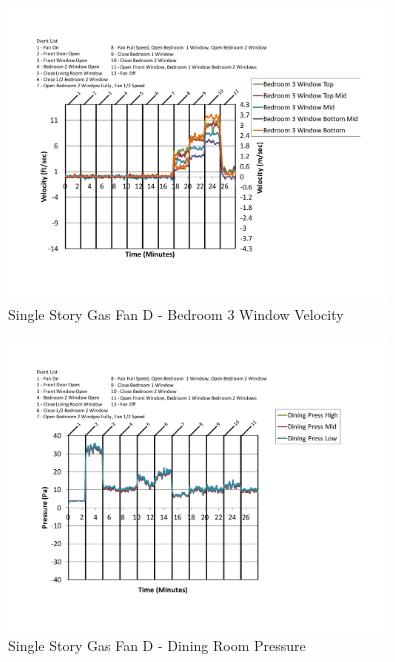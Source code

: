 \documentclass{article}
\begin{document}
\begin{appendices}
	\begin{figure}[H]
		\centering
		\includegraphics[height=3.05in,trim=0.67in 1.1in 0.67in 0.8in,clip=true]{0_Images/Results_Charts/ColdFlow/Single_Story/Gas/D/Bedroom_3_Window_Velocity.pdf}
		\caption{Single Story Gas Fan D - Bedroom 3 Window Velocity}
	\end{figure}
 

	\begin{figure}[H]
		\centering
		\includegraphics[height=3.05in,trim=0.67in 1.1in 0.67in 0.8in,clip=true]{0_Images/Results_Charts/ColdFlow/Single_Story/Gas/D/Dining_Room_Pressure.pdf}
		\caption{Single Story Gas Fan D - Dining Room Pressure}
	\end{figure}
 
	\clearpage


\end{appendices}
\end{document}
